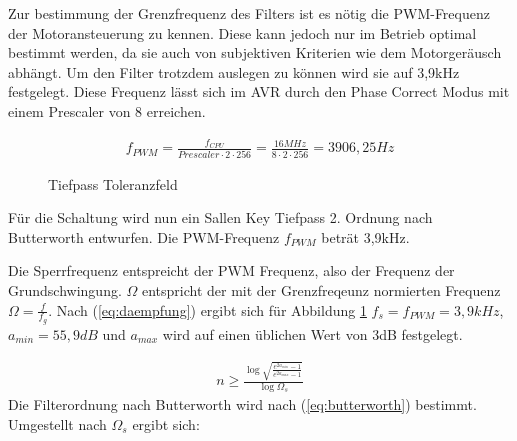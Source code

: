 Zur bestimmung der Grenzfrequenz des Filters ist es nötig die PWM-Frequenz der Motoransteuerung zu kennen. Diese kann jedoch nur im Betrieb optimal bestimmt werden, da sie
auch von subjektiven Kriterien wie dem Motorgeräusch abhängt. Um den Filter trotzdem auslegen zu können wird sie auf 3,9kHz festgelegt. Diese Frequenz
lässt sich im AVR durch den Phase Correct Modus mit einem Prescaler von 8 erreichen.

\begin{align*}
f_{PWM}=\frac{f_{CPU}}{Prescaler\cdot 2 \cdot 256} = \frac{16 MHz }{8 \cdot 2 \cdot 256 }=3906,25 Hz
\end{align*}


\begin{figure}[H]
\centering
{}
\caption{Tiefpass Toleranzfeld}%
\label{fig:analog}
\end{figure}



Für die Schaltung wird nun ein Sallen Key Tiefpass 2. Ordnung nach Butterworth entwurfen. Die PWM-Frequenz $f_{PWM}$ beträt 3,9kHz.

Die Sperrfrequenz entspreicht der PWM Frequenz, also der Frequenz der Grundschwingung. $\Omega$ entspricht der mit der Grenzfreqeunz 
normierten Frequenz $\Omega=\frac{f}{f_g}$. Nach (\ref{eq:daempfung}) ergibt sich für Abbildung \ref{fig:analog}
$f_s=f_{PWM}=3,9 kHz$, $a_{min}=55,9 dB$ und $a_{max}$ wird auf einen üblichen Wert von 3dB festgelegt.







\begin{align}
n \ge \frac{\log{\sqrt{\frac{e^{2a_{min}}-1}{e^{2a_{max}}-1}}}}{\log{\Omega_s}}
\label{eq:butterworth}
\end{align}
Die Filterordnung nach Butterworth wird nach (\ref{eq:butterworth}) bestimmt\cite{AnalogFilter}. Umgestellt nach $\Omega_s$ ergibt sich:

